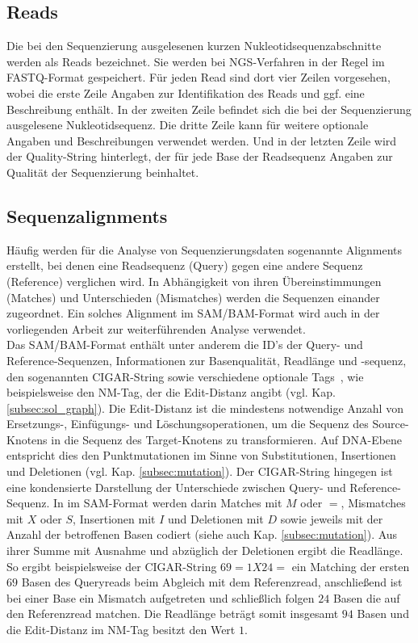 \subsection{Reads} \label{subsec:fastq}

Die bei den Sequenzierung ausgelesenen kurzen Nukleotidsequenzabschnitte werden als Reads bezeichnet. Sie werden bei NGS-Verfahren in der Regel im FASTQ-Format gespeichert. Für jeden Read sind dort vier Zeilen vorgesehen, wobei die erste Zeile Angaben zur Identifikation des Reads und ggf. eine Beschreibung enthält. In der zweiten Zeile befindet sich die bei der Sequenzierung ausgelesene Nukleotidsequenz. Die dritte Zeile kann für weitere optionale Angaben und Beschreibungen verwendet werden. Und in der letzten Zeile wird der Quality-String hinterlegt, der für jede Base der Readsequenz Angaben zur Qualität der Sequenzierung beinhaltet. 

\subsection{Sequenzalignments} \label{subsec:samformat}

Häufig werden für die Analyse von Sequenzierungsdaten sogenannte Alignments erstellt, bei denen eine Readsequenz (Query) gegen eine andere Sequenz (Reference) verglichen wird. In Abhängigkeit von ihren Übereinstimmungen (Matches) und Unterschieden (Mismatches) werden die Sequenzen einander zugeordnet. Ein solches Alignment im SAM/BAM-Format wird auch in der vorliegenden Arbeit zur weiterführenden Analyse verwendet. \\

Das SAM/BAM-Format enthält unter anderem die ID's der Query- und Reference-Sequenzen, Informationen zur Basenqualität, Readlänge und -sequenz, den sogenannten CIGAR-String sowie verschiedene optionale Tags~\cite{sam_bam, li_2009}, wie beispielsweise den NM-Tag, der die Edit-Distanz angibt (vgl. Kap. \ref{subsec:sol_graph}). Die Edit-Distanz ist die mindestens notwendige Anzahl von Ersetzungs-, Einfügungs- und Löschungsoperationen, um die Sequenz des Source-Knotens in die Sequenz des Target-Knotens zu transformieren. Auf DNA-Ebene entspricht dies den Punktmutationen im Sinne von Substitutionen, Insertionen und Deletionen (vgl. Kap. \ref{subsec:mutation}). Der CIGAR-String hingegen ist eine kondensierte Darstellung der Unterschiede zwischen Query- und Reference-Sequenz. In im SAM-Format werden darin Matches mit $ M $ oder $ = $, Mismatches mit $ X $  oder $ S $,  Insertionen mit $ I $ und Deletionen mit $ D $ sowie jeweils mit der Anzahl der betroffenen Basen codiert (siehe auch Kap. \ref{subsec:mutation}). Aus ihrer Summe mit Ausnahme und abzüglich der Deletionen ergibt die Readlänge. So ergibt beispielsweise der CIGAR-String $ 69=1X24= $ ein Matching der ersten $ 69 $ Basen des Queryreads beim Abgleich mit dem Referenzread, anschließend ist bei einer Base ein Mismatch aufgetreten und schließlich folgen $ 24 $ Basen die auf den Referenzread matchen. Die Readlänge beträgt somit insgesamt $ 94 $ Basen und die Edit-Distanz im NM-Tag besitzt den Wert $ 1 $. \\

